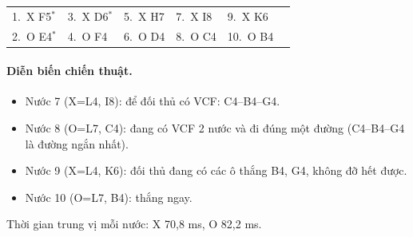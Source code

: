 {\footnotesize\linespread{1}\selectfont
\noindent\begin{tabularx}{\linewidth}{*{6}{X}}
\toprule
1.~X F5$^\ast$ & 3.~X D6$^\ast$ & 5.~X H7 & 7.~X I8 & 9.~X K6 &  \\
2.~O E4$^\ast$ & 4.~O F4 & 6.~O D4 & 8.~O C4 & 10.~O B4 &  \\
\bottomrule
\end{tabularx}\par}
\paragraph{Diễn biến chiến thuật.}
\begin{itemize}\small
\setlength{\itemsep}{0pt}
  \item Nước 7 (X=L4, I8): để đối thủ có VCF: C4--B4--G4.
  \item Nước 8 (O=L7, C4): đang có VCF 2 nước và đi đúng một đường (C4--B4--G4 là đường ngắn nhất).
  \item Nước 9 (X=L4, K6): đối thủ đang có các ô thắng B4, G4, không đỡ hết được.
  \item Nước 10 (O=L7, B4): thắng ngay.
\end{itemize}
Thời gian trung vị mỗi nước: X 70,8 ms, O 82,2 ms.
\clearpage

